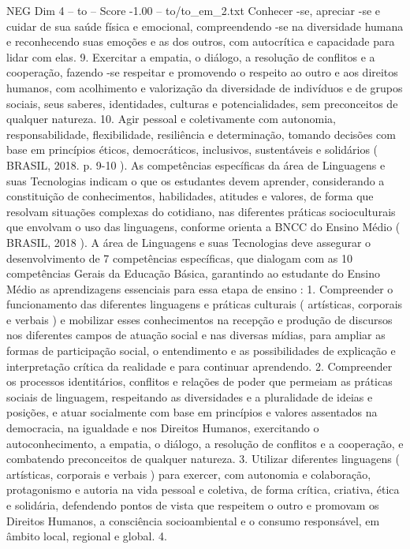 \begin{textsample}{NEG Dim 4 – to – Score -1.00 – to/to\_em\_2.txt}
Conhecer -se, apreciar -se e cuidar de sua saúde física e emocional, compreendendo -se na diversidade humana e reconhecendo suas emoções e as dos outros, com autocrítica e capacidade para lidar com elas. 9.
Exercitar a empatia, o diálogo, a resolução de conflitos e a cooperação, fazendo -se respeitar e promovendo o respeito ao outro e aos direitos humanos, com acolhimento e valorização da diversidade de indivíduos e de grupos sociais, seus saberes, identidades, culturas e potencialidades, sem preconceitos de qualquer natureza. 10.
Agir pessoal e coletivamente com autonomia, responsabilidade, flexibilidade, resiliência e determinação, tomando decisões com base em princípios éticos, democráticos, inclusivos, sustentáveis e solidários ( BRASIL, 2018. p. 9-10 ).
As competências específicas da área de Linguagens e suas Tecnologias indicam o que os estudantes devem aprender, considerando a constituição de conhecimentos, habilidades, atitudes e valores, de forma que resolvam situações complexas do cotidiano, nas diferentes práticas socioculturais que envolvam o uso das linguagens, conforme orienta a BNCC do Ensino Médio ( BRASIL, 2018 ).
A área de Linguagens e suas Tecnologias deve assegurar o desenvolvimento de 7 competências específicas, que dialogam com as 10 competências Gerais da Educação Básica, garantindo ao estudante do Ensino Médio as aprendizagens essenciais para essa etapa de ensino : 1.
Compreender o funcionamento das diferentes linguagens e práticas culturais ( artísticas, corporais e verbais ) e mobilizar esses conhecimentos na recepção e produção de discursos nos diferentes campos de atuação social e nas diversas mídias, para ampliar as formas de participação social, o entendimento e as possibilidades de explicação e interpretação crítica da realidade e para continuar aprendendo. 2.
Compreender os processos identitários, conflitos e relações de poder que permeiam as práticas sociais de linguagem, respeitando as diversidades e a pluralidade de ideias e posições, e atuar socialmente com base em princípios e valores assentados na democracia, na igualdade e nos Direitos Humanos, exercitando o autoconhecimento, a empatia, o diálogo, a resolução de conflitos e a cooperação, e combatendo preconceitos de qualquer natureza. 3.
Utilizar diferentes linguagens ( artísticas, corporais e verbais ) para exercer, com autonomia e colaboração, protagonismo e autoria na vida pessoal e coletiva, de forma crítica, criativa, ética e solidária, defendendo pontos de vista que respeitem o outro e promovam os Direitos Humanos, a consciência socioambiental e o consumo responsável, em âmbito local, regional e global. 4.

\end{textsample}
